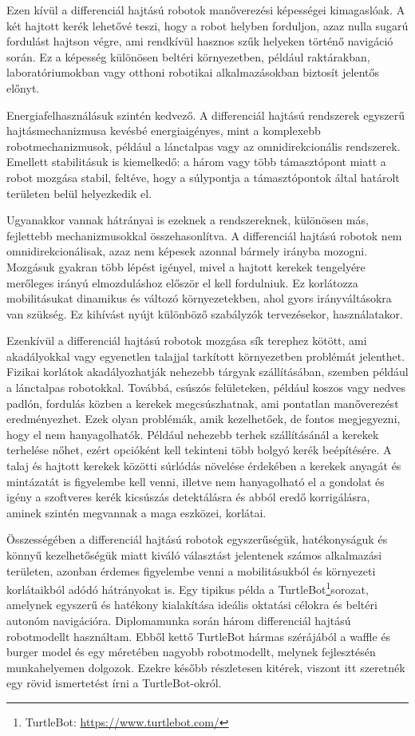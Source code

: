 Ezen kívül a differenciál hajtású robotok manőverezési képességei kimagaslóak. A két hajtott kerék lehetővé teszi, hogy a robot helyben forduljon, azaz nulla sugarú fordulást hajtson végre, ami rendkívül hasznos szűk helyeken történő navigáció során. Ez a képesség különösen beltéri környezetben, például raktárakban, laboratóriumokban vagy otthoni robotikai alkalmazásokban biztosít jelentős előnyt.

Energiafelhasználásuk szintén kedvező. A differenciál hajtású rendszerek egyszerű hajtásmechanizmusa kevésbé energiaigényes, mint a komplexebb robotmechanizmusok, például a lánctalpas vagy az omnidirekcionális rendszerek. Emellett stabilitásuk is kiemelkedő: a három vagy több támasztópont miatt a robot mozgása stabil, feltéve, hogy a súlypontja a támasztópontok által határolt területen belül helyezkedik el.

Ugyanakkor vannak hátrányai is ezeknek a rendszereknek, különösen más, fejlettebb mechanizmusokkal összehasonlítva. A differenciál hajtású robotok nem omnidirekcionálisak, azaz nem képesek azonnal bármely irányba mozogni. Mozgásuk gyakran több lépést igényel, mivel a hajtott kerekek tengelyére merőleges irányú elmozduláshoz először el kell fordulniuk. Ez korlátozza mobilitásukat dinamikus és változó környezetekben, ahol gyors irányváltásokra van szükség. Ez kihívást nyújt különböző szabályzók tervezésekor, használatakor.

Ezenkívül a differenciál hajtású robotok mozgása sík terephez kötött, ami akadályokkal vagy egyenetlen talajjal tarkított környezetben problémát jelenthet. Fizikai korlátok akadályozhatják nehezebb tárgyak szállításában, szemben például a lánctalpas robotokkal. Továbbá, csúszós felületeken, például koszos vagy nedves padlón, fordulás közben a kerekek megcsúszhatnak, ami pontatlan manőverezést eredményezhet. Ezek olyan problémák, amik kezelhetőek, de fontos megjegyezni, hogy el nem hanyagolhatók. Például nehezebb terhek szállításánál a kerekek terhelése nőhet, ezért opcióként kell tekinteni több bolgyó kerék beépítésére. A talaj és hajtott kerekek közötti súrlódás növelése érdekében a kerekek anyagát és mintázatát is figyelembe kell venni, illetve nem hanyagolható el a gondolat és igény a szoftveres kerék kicsúszás detektálásra és abból eredő korrigálásra, aminek szintén megvannak a maga eszközei, korlátai.

Összességében a differenciál hajtású robotok egyszerűségük, hatékonyságuk és könnyű kezelhetőségük miatt kiváló választást jelentenek számos alkalmazási területen, azonban érdemes figyelembe venni a mobilitásukból és környezeti korlátaikból adódó hátrányokat is. Egy tipikus példa a TurtleBot\footnote{TurtleBot: \url{https://www.turtlebot.com/}}sorozat, amelynek egyszerű és hatékony kialakítása ideális oktatási célokra és beltéri autonóm navigációra. Diplomamunka során három differenciál hajtású robotmodellt használtam. Ebből kettő TurtleBot hármas szérájából a waffle és burger model és egy méretében nagyobb robotmodellt, melynek fejlesztésén munkahelyemen dolgozok. Ezekre később részletesen kitérek, viszont itt szeretnék egy rövid ismertetést írni a TurtleBot-okról.

